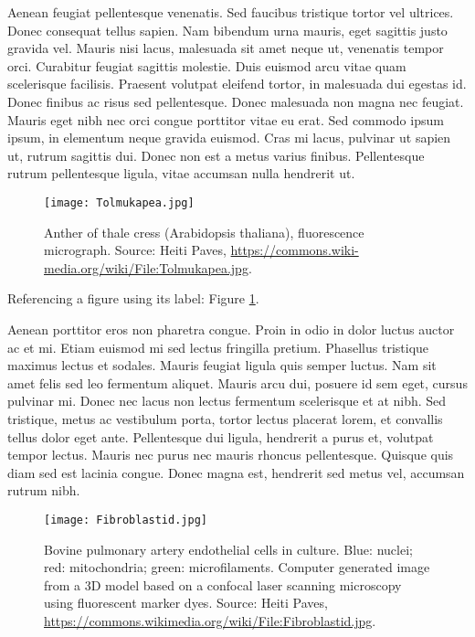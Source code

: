\documentclass[
	a4paper, %
	10pt, %
	unnumberedsections, %
	twoside, %
]{LTJournalArticle}
\begin{document}
Aenean feugiat pellentesque venenatis. Sed faucibus tristique tortor vel ultrices. Donec consequat tellus sapien. Nam bibendum urna mauris, eget sagittis justo gravida vel. Mauris nisi lacus, malesuada sit amet neque ut, venenatis tempor orci. Curabitur feugiat sagittis molestie. Duis euismod arcu vitae quam scelerisque facilisis. Praesent volutpat eleifend tortor, in malesuada dui egestas id. Donec finibus ac risus sed pellentesque. Donec malesuada non magna nec feugiat. Mauris eget nibh nec orci congue porttitor vitae eu erat. Sed commodo ipsum ipsum, in elementum neque gravida euismod. Cras mi lacus, pulvinar ut sapien ut, rutrum sagittis dui. Donec non est a metus varius finibus. Pellentesque rutrum pellentesque ligula, vitae accumsan nulla hendrerit ut.

\begin{figure} %
	\texttt{[image: Tolmukapea.jpg]}
	\caption{Anther of thale cress (Arabidopsis thaliana), fluorescence micrograph. Source: Heiti Paves, \href{https://commons.wikimedia.org/wiki/File:Tolmukapea.jpg}{https://commons.wiki-\\media.org/wiki/File:Tolmukapea.jpg}.}
	\label{fig:tcanther}
\end{figure}

Referencing a figure using its label: Figure \ref{fig:tcanther}.

Aenean porttitor eros non pharetra congue. Proin in odio in dolor luctus auctor ac et mi. Etiam euismod mi sed lectus fringilla pretium. Phasellus tristique maximus lectus et sodales. Mauris feugiat ligula quis semper luctus. Nam sit amet felis sed leo fermentum aliquet. Mauris arcu dui, posuere id sem eget, cursus pulvinar mi. Donec nec lacus non lectus fermentum scelerisque et at nibh. Sed tristique, metus ac vestibulum porta, tortor lectus placerat lorem, et convallis tellus dolor eget ante. Pellentesque dui ligula, hendrerit a purus et, volutpat tempor lectus. Mauris nec purus nec mauris rhoncus pellentesque. Quisque quis diam sed est lacinia congue. Donec magna est, hendrerit sed metus vel, accumsan rutrum nibh.

\begin{figure*} %
	\texttt{[image: Fibroblastid.jpg]}
	\caption{Bovine pulmonary artery endothelial cells in culture. Blue: nuclei; red: mitochondria; green: microfilaments. Computer generated image from a 3D model based on a confocal laser scanning microscopy using fluorescent marker dyes. Source: Heiti Paves, \href{https://commons.wikimedia.org/wiki/File:Fibroblastid.jpg}{https://commons.wikimedia.org/wiki/File:Fibroblastid.jpg}.}
	\label{fig:bpartery}
\end{figure*}
\end{document}
